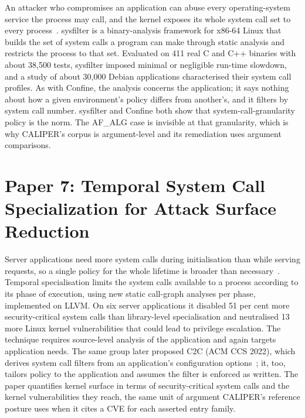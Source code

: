  An attacker who compromises an application can abuse every operating-system service the process may call, and the kernel exposes its whole system call set to every process~\cite{sysfilter}.
 sysfilter is a binary-analysis framework for x86-64 Linux that builds the set of system calls a program can make through static analysis and restricts the process to that set.
 Evaluated on 411 real C and C++ binaries with about 38,500 tests, sysfilter imposed minimal or negligible run-time slowdown, and a study of about 30,000 Debian applications characterised their system call profiles.
 As with Confine, the analysis concerns the application; it says nothing about how a given environment's policy differs from another's, and it filters by system call number.
 sysfilter and Confine both show that system-call-granularity policy is the norm. The AF\_ALG case is invisible at that granularity, which is why CALIPER's corpus is argument-level and its remediation uses argument comparisons.

\section{Paper 7: Temporal System Call Specialization for Attack Surface Reduction}
\label{lit:temporal}

 Server applications need more system calls during initialisation than while serving requests, so a single policy for the whole lifetime is broader than necessary~\cite{temporal}.
 Temporal specialisation limits the system calls available to a process according to its phase of execution, using new static call-graph analyses per phase, implemented on LLVM.
 On six server applications it disabled 51 per cent more security-critical system calls than library-level specialisation and neutralised 13 more Linux kernel vulnerabilities that could lead to privilege escalation.
 The technique requires source-level analysis of the application and again targets application needs. The same group later proposed C2C (ACM CCS 2022), which derives system call filters from an application's configuration options~\cite{c2c}; it, too, tailors policy to the application and assumes the filter is enforced as written.
 The paper quantifies kernel surface in terms of security-critical system calls and the kernel vulnerabilities they reach, the same unit of argument CALIPER's reference posture uses when it cites a CVE for each asserted entry family.

